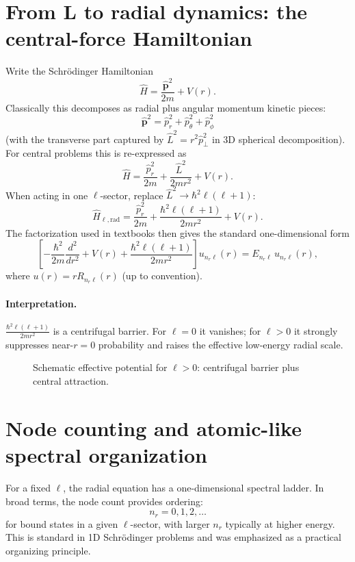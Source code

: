 \section{From \(\mathbf L\) to radial dynamics: the central-force Hamiltonian}
Write the Schrödinger Hamiltonian
\[
\hat H=\frac{\hat{\mathbf p}^2}{2m}+V(r).
\]
Classically this decomposes as radial plus angular momentum kinetic pieces:
\[
\hat{\mathbf p}^2=\hat p_r^2+\hat p_\theta^2+\hat p_\phi^2
\]
(with the transverse part captured by \(\hat L^2=r^2\hat p_\perp^2\) in \(3\)D spherical decomposition). For central problems this is re-expressed as
\[
\hat H=\frac{\hat p_r^2}{2m}+\frac{\hat L^2}{2mr^2}+V(r).
\]
When acting in one \(\ell\)-sector, replace \(\hat L^2\to \hbar^2\ell(\ell+1)\):
\[
\hat H_{\ell,\mathrm{rad}}
=\frac{\hat p_r^2}{2m}+\frac{\hbar^2\ell(\ell+1)}{2mr^2}+V(r).
\]
The factorization used in textbooks then gives the standard one-dimensional form
\[
\left[-\frac{\hbar^2}{2m}\frac{d^2}{dr^2}
+V(r)+\frac{\hbar^2\ell(\ell+1)}{2mr^2}\right]u_{n_r\ell}(r)=E_{n_r\ell}\,u_{n_r\ell}(r),
\]
where \(u(r)=rR_{n_r\ell}(r)\) (up to convention).

\paragraph{Interpretation.}
\(\frac{\hbar^2\ell(\ell+1)}{2mr^2}\) is a centrifugal barrier. For \(\ell=0\) it vanishes; for \(\ell>0\) it strongly suppresses near-\(r=0\) probability and raises the effective low-energy radial scale.

\begin{figure}
\centering
{}
\caption{Schematic effective potential for \(\ell>0\): centrifugal barrier plus central attraction.}
\end{figure}

\section{Node counting and atomic-like spectral organization}
For a fixed \(\ell\), the radial equation has a one-dimensional spectral ladder. In broad terms, the node count provides ordering:
\[
n_r=0,1,2,\ldots
\]
for bound states in a given \(\ell\)-sector, with larger \(n_r\) typically at higher energy. This is standard in 1D Schrödinger problems and was emphasized as a practical organizing principle.

